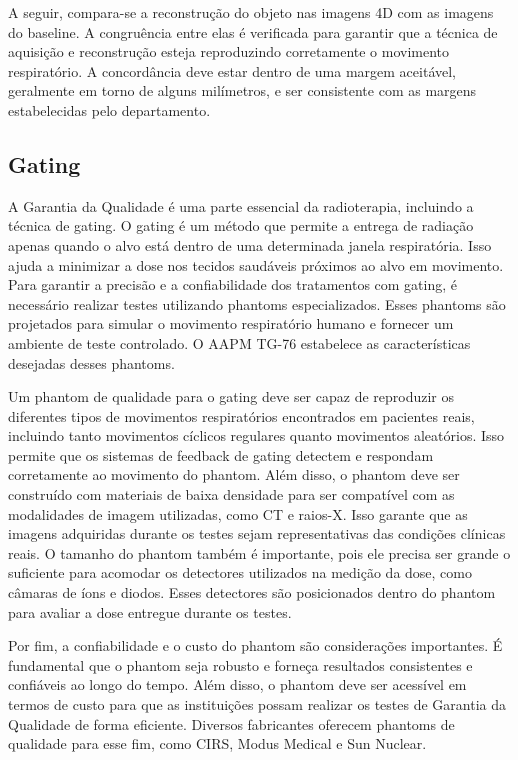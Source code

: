 \documentclass[11pt,a4paper]{article}
\begin{document}
	A seguir, compara-se a reconstrução do objeto nas imagens 4D com as imagens do baseline. A congruência entre elas é verificada para garantir que a técnica de aquisição e reconstrução esteja reproduzindo corretamente o movimento respiratório. A concordância deve estar dentro de uma margem aceitável, geralmente em torno de alguns milímetros, e ser consistente com as margens estabelecidas pelo departamento.
	
\subsection*{Gating}

	A Garantia da Qualidade é uma parte essencial da radioterapia, incluindo a técnica de gating. O gating é um método que permite a entrega de radiação apenas quando o alvo está dentro de uma determinada janela respiratória. Isso ajuda a minimizar a dose nos tecidos saudáveis próximos ao alvo em movimento. Para garantir a precisão e a confiabilidade dos tratamentos com gating, é necessário realizar testes utilizando phantoms especializados. Esses phantoms são projetados para simular o movimento respiratório humano e fornecer um ambiente de teste controlado. O AAPM TG-76 estabelece as características desejadas desses phantoms.

	Um phantom de qualidade para o gating deve ser capaz de reproduzir os diferentes tipos de movimentos respiratórios encontrados em pacientes reais, incluindo tanto movimentos cíclicos regulares quanto movimentos aleatórios. Isso permite que os sistemas de feedback de gating detectem e respondam corretamente ao movimento do phantom. Além disso, o phantom deve ser construído com materiais de baixa densidade para ser compatível com as modalidades de imagem utilizadas, como CT e raios-X. Isso garante que as imagens adquiridas durante os testes sejam representativas das condições clínicas reais. O tamanho do phantom também é importante, pois ele precisa ser grande o suficiente para acomodar os detectores utilizados na medição da dose, como câmaras de íons e diodos. Esses detectores são posicionados dentro do phantom para avaliar a dose entregue durante os testes.  

	Por fim, a confiabilidade e o custo do phantom são considerações importantes. É fundamental que o phantom seja robusto e forneça resultados consistentes e confiáveis ao longo do tempo. Além disso, o phantom deve ser acessível em termos de custo para que as instituições possam realizar os testes de Garantia da Qualidade de forma eficiente. Diversos fabricantes oferecem phantoms de qualidade para esse fim, como CIRS, Modus Medical e Sun Nuclear.
\end{document}
